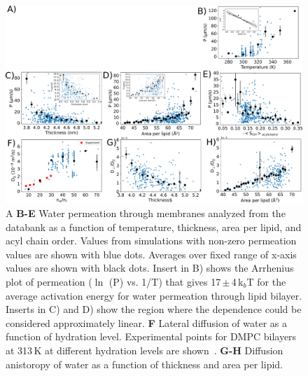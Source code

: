 \documentclass[fleqn,10pt]{wlscirep}
\begin{document}
\begin{figure}[tb]
    \centering
    \includegraphics[width=180mm]{Figures/permeation2.pdf}
    \caption{A 
    {\bf B-E} Water permeation through membranes analyzed from the databank as a function of temperature, thickness, area per lipid, and acyl chain order. Values from simulations with non-zero permeation values are shown with blue dots. Averages over fixed range of x-axis values are shown with black dots. Insert in B) shows the Arrhenius plot of permeation ($\ln$ (P) vs. 1/T) that gives 17\,$\pm$\,4\,k$_b$T for the average activation energy for water permeation through lipid bilayer. Inserts in C) and D) show the region where the dependence could be considered approximately linear.
    {\bf F} Lateral diffusion of water as a function of hydration level. Experimental points for DMPC bilayers at 313\,K at different hydration levels are shown~\cite{rudakova04}.
    {\bf G-H} Diffusion anistoropy of water as a function of thickness and area per lipid. }
    \label{fig:permeability}
\end{figure}
\end{document}
